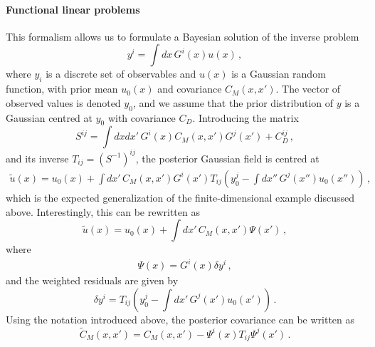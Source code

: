 \paragraph{Functional linear problems} This formalism allows us to formulate a Bayesian solution of the inverse problem 
\begin{equation}
  \label{eq:BayesLinearInverse}
  y^i = \int dx\, G^i(x) u(x)\, ,
\end{equation}
where $y_i$ is a discrete set of observables and $u(x)$ is a Gaussian random
function, with prior mean $u_0(x)$ and covariance $C_M(x,x')$. The vector of
observed values is denoted $y_0$, and we assume that the prior distribution of
$y$ is a Gaussian centred at $y_0$ with covariance $C_D$. Introducing the matrix
\begin{equation}
  \label{eq:Smatrix}
  S^{ij} =
  \int dx dx'\, G^i(x) C_M(x,x') G^j(x') + C_D^{ij}\, ,
\end{equation}
and its inverse $T_{ij}=\left(S^{-1}\right)^{ij}$, the posterior Gaussian field is centred at
\begin{align}
  \label{eq:PostMeanFunc}
  \tilde{u}(x) = u_0(x) + 
  \int dx'\, C_M(x,x') G^i(x') T_{ij} \left(
    y_0^j - \int dx''\, G^j(x'') u_0(x'') 
  \right)\, ,
\end{align}
which is the expected generalization of the finite-dimensional example discussed
above. Interestingly, this can be rewritten as
\begin{equation}
  \label{eq:TowardsBackus}
  \tilde{u}(x) = u_0(x) + 
  \int dx'\, C_M(x,x') \Psi(x')\, ,
\end{equation}
where 
\begin{eqnarray}
  \label{eq:PsiDef}
  \Psi(x) = G^i(x) \delta y^i\, ,
\end{eqnarray}
and the weighted residuals are given by
\begin{equation}
  \label{eq:DeltaYDef}
  \delta y^i = T_{ij} \left(
  y_0^j - \int dx'\, G^j(x') u_0(x')
  \right)\, .
\end{equation}
Using the notation introduced above, the posterior covariance can be written as
\begin{equation}
  \label{eq:PostCovFunc}
  \tilde{C}_M(x,x') = 
  C_M(x,x') - \Psi^i(x) T_{ij} \Psi^j(x')\, .
\end{equation}

